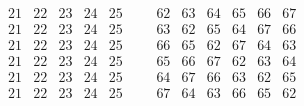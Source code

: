 \documentclass{amsart}
\begin{document}
\begin{align*}
\begin{array}{r||c|c|c}
\begin{array}{r}
    \end{array}
&
\begin{array}{c|c|c|c|c}
21 & 22 & 23 & 24 & 25 \\
21 & 22 & 23 & 24 & 25 \\
21 & 22 & 23 & 24 & 25 \\
21 & 22 & 23 & 24 & 25 \\
21 & 22 & 23 & 24 & 25 \\
21 & 22 & 23 & 24 & 25 \\
\end{array}
&&
   \begin{array}{cccccc}
62 & 63 & 64 & 65 & 66 & 67 \\
63 & 62 & 65 & 64 & 67 & 66 \\
66 & 65 & 62 & 67 & 64 & 63 \\
65 & 66 & 67 & 62 & 63 & 64 \\
64 & 67 & 66 & 63 & 62 & 65 \\
67 & 64 & 63 & 66 & 65 & 62 \\
   \end{array}
  \end{array}
\end{align*}

\bigskip
\end{document}
